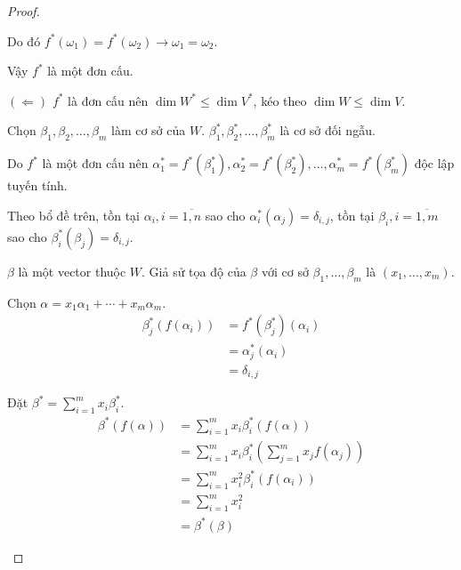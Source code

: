 \begin{proof}
\begin{enumerate}[label = (\arabic*)]
              Do đó ${f}^{*}(\omega_{1}) = {f}^{*}(\omega_{2}) \rightarrow \omega_{1} = \omega_{2}$.
              
              Vậy ${f}^{*}$ là một đơn cấu.
              
              $(\Leftarrow)$ $f^{*}$ là đơn cấu nên $\dim {W}^{*} \leq \dim {V}^{*}$, kéo theo $\dim W \leq \dim V$.
              
              Chọn $\beta_{1}, \beta_{2}, \ldots, \beta_{m}$ làm cơ sở của $W$. ${\beta}^{*}_{1}, {\beta}^{*}_{2}, \ldots, {\beta}^{*}_{m}$ là cơ sở đối ngẫu.
              
              Do $f^{*}$ là một đơn cấu nên ${\alpha}^{*}_{1} = {f}^{*}({\beta}^{*}_{1}), {\alpha}^{*}_{2} = {f}^{*}({\beta}^{*}_{2}), \ldots, {\alpha}^{*}_{m} = {f}^{*}({\beta}^{*}_{m})$ độc lập tuyến tính.
              
              Theo bổ đề trên, tồn tại $\alpha_{i}, i = \overline{1, n}$ sao cho ${\alpha}^{*}_{i}(\alpha_{j}) = \delta_{i, j}$, tồn tại $\beta_{i}, i = \overline{1, m}$ sao cho ${\beta}^{*}_{i}(\beta_{j}) = \delta_{i, j}$.
              
              $\beta$ là một vector thuộc $W$. Giả sử tọa độ của $\beta$ với cơ sở $\beta_{1}, \ldots, \beta_{m}$ là $(x_{1}, \ldots, x_{m})$.
              
              Chọn $\alpha = x_{1}\alpha_{1} + \cdots + x_{m}\alpha_{m}$.
              \begin{align*}
                  \beta^{*}_{j}(f(\alpha_{i})) & = {f^{*}}(\beta^{*}_{j})(\alpha_{i}) \\
                                               & = \alpha^{*}_{j}(\alpha_{i})         \\
                                               & = \delta_{i,j}
              \end{align*}
              
              Đặt $\beta^{*} = \sum^{m}_{i=1}x_{i}\beta^{*}_{i}$.
              \begin{align*}
                  \beta^{*}(f(\alpha)) & = \sum^{m}_{i=1}x_{i}\beta^{*}_{i}(f(\alpha))                                     \\
                                       & = \sum^{m}_{i=1}x_{i}\beta^{*}_{i}\left( \sum^{m}_{j=1}x_{j}f(\alpha_{j}) \right) \\
                                       & = \sum^{m}_{i=1}x^{2}_{i}\beta^{*}_{i}\left(f(\alpha_{i})\right)                  \\
                                       & = \sum^{m}_{i=1}x^{2}_{i}                                                         \\
                                       & = \beta^{*}(\beta)
              \end{align*}
            

\end{enumerate}
\end{proof}
